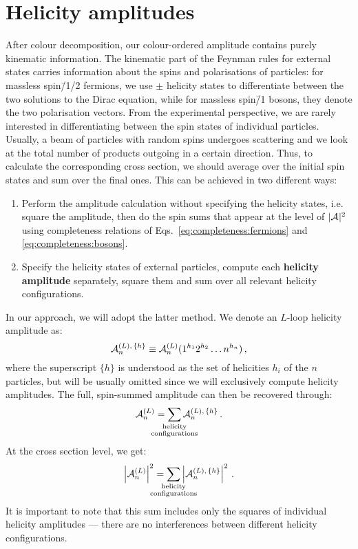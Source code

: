 \documentclass[main.tex]{subfiles}
\begin{document}
\section{Helicity amplitudes}
After colour decomposition, our colour-ordered amplitude contains purely kinematic information. The kinematic part of the Feynman rules for external states carries information about the spins and polarisations of particles: for massless spin\=/1/2 fermions, we use $\pm$ helicity states to differentiate between the two solutions to the Dirac equation, while for massless spin\=/1 bosons, they denote the two polarisation vectors. From the experimental perspective, we are rarely interested in differentiating between the spin states of individual particles. Usually, a beam of particles with random spins undergoes scattering and we look at the total number of products outgoing in a certain direction. Thus, to calculate the corresponding cross section, we should average over the initial spin states and sum over the final ones. This can be achieved in two different ways: 
\begin{enumerate}
    \item Perform the amplitude calculation without specifying the helicity states, i.e. square the amplitude, then do the spin sums that appear at the level of $|\mathcal{A}_{}^{}|^2$ using completeness relations of Eqs.~\ref{eq:completeness:fermions} and \ref{eq:completeness:bosons}.
    \item Specify the helicity states of external particles, compute each \textbf{helicity amplitude} separately, square them and sum over all relevant helicity configurations.
\end{enumerate}
In our approach, we will adopt the latter method. We denote an $L$-loop helicity amplitude as:
\begin{equation} \label{eq:helampdef}
    \mathcal{A}_{n}^{(L),\,\{h\}} \equiv \mathcal{A}_{n}^{(L)}(1^{h_1}2^{h_2} \ldots n^{h_n})\,,
\end{equation}
where the superscript $\{h\}$ is understood as the set of helicities $h_i$ of the $n$ particles, but will be usually omitted since we will exclusively compute helicity amplitudes. The full, spin-summed amplitude can then be recovered through:
\begin{equation}
    \ampl{n}{(L)} = \sum_{\mathclap{\substack{\text{helicity} \\ \text{configurations}}}} \ampl{n}{(L),\,\{h\}} \,.
\end{equation}
At the cross section level, we get:
\begin{equation}
    \left|\ampl{n}{(L)}\right|^2 = \sum_{\mathclap{\substack{\text{helicity} \\ \text{configurations}}}} \left|\ampl{n}{(L),\,\{h\}} \right|^2 \,.
\end{equation}
It is important to note that this sum includes only the squares of individual helicity amplitudes --- there are no interferences between different helicity configurations.
\end{document}
